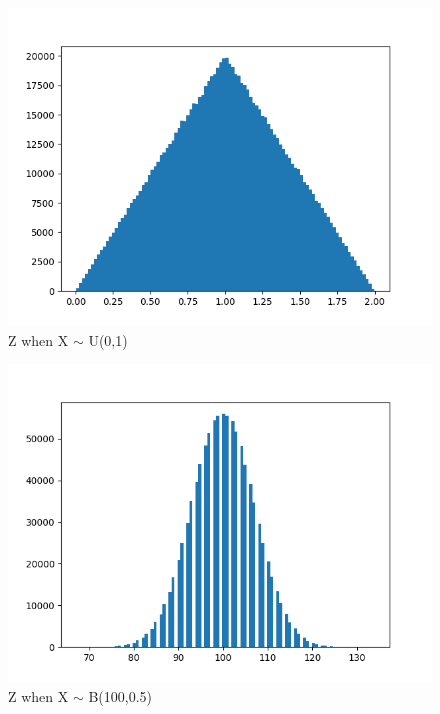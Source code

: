 \documentclass[journal,12pt,twocolumn]{IEEEtran}
\begin{document}
\begin{figure}[!ht]
\centering
\includegraphics[width=\columnwidth]{figures/uniform.png}
\caption{Z when X $\sim$ U(0,1)}
\label{fig:uniform}
\end{figure}
\begin{figure}[!ht]
\centering
\includegraphics[width=\columnwidth]{figures/binom.png}
\caption{Z when X $\sim$ B(100,0.5)}
\label{fig:binomial}
\end{figure}
\end{document}

